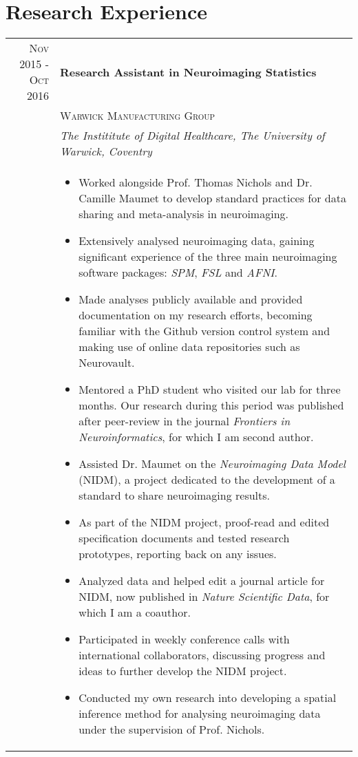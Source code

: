 \documentclass[a4paper,10pt]{article}
\begin{document}
\newpage 
\section{Research Experience}
\begin{longtable}{rl}	
 \textsc{Nov} 2015 - \textsc{Oct} 2016
& \large{\textbf{Research Assistant in Neuroimaging Statistics}}\\
& \textsc{Warwick Manufacturing Group}\\
& \textit{The Instititute of Digital Healthcare, The University of Warwick, Coventry} \\
&\begin{minipage}[t]{0.8\textwidth}
 \begin{itemize}[leftmargin=*]
 \item Worked alongside Prof. Thomas Nichols and Dr. Camille Maumet to develop standard practices for data sharing and meta-analysis in neuroimaging.
 \item Extensively analysed neuroimaging data, gaining significant experience of the three main neuroimaging software packages: \textit{SPM}, \textit{FSL} and \textit{AFNI}. 
 \item Made analyses publicly available and provided documentation on my research efforts, becoming familiar with the Github version control system and making use of online data repositories such as Neurovault. 
 \item Mentored a PhD student who visited our lab for three months.  Our research during this period was published after peer-review in the journal \textit{Frontiers in Neuroinformatics}, for which I am second author. 
 \item Assisted Dr. Maumet on the \textit{Neuroimaging Data Model} (NIDM), a project dedicated to the development of a standard to share neuroimaging results.
 \item As part of the NIDM project, proof-read and edited specification documents and tested research prototypes, reporting back on any issues. 
 \item Analyzed data and helped edit a journal article for NIDM, now published in \textit{Nature Scientific Data}, for which I am a coauthor. 
 \item Participated in weekly conference calls with international collaborators, discussing progress and ideas to further develop the NIDM project.
 \item Conducted my own research into developing a spatial inference method for analysing neuroimaging data under the supervision of Prof. Nichols. 

\end{itemize}
\end{minipage}
\end{longtable}
\end{document}
